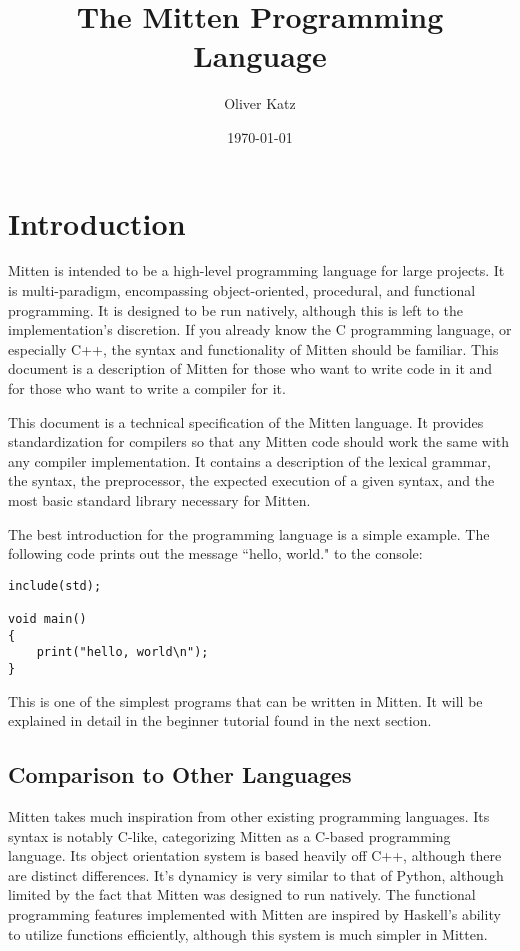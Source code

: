 \documentclass[10pt,a4paper]{article}
\title{The Mitten Programming Language}
\author{Oliver Katz}
\date{\today}
\begin{document}
\maketitle
\tableofcontents
\newpage

\section{Introduction}
Mitten is intended to be a high-level programming language for large projects. It is multi-paradigm, encompassing object-oriented, procedural, and functional programming. It is designed to be run natively, although this is left to the implementation's discretion. If you already know the C programming language, or especially C++, the syntax and functionality of Mitten should be familiar. This document is a description of Mitten for those who want to write code in it and for those who want to write a compiler for it.

This document is a technical specification of the Mitten language. It provides standardization for compilers so that any Mitten code should work the same with any compiler implementation. It contains a description of the lexical grammar, the syntax, the preprocessor, the expected execution of a given syntax, and the most basic standard library necessary for Mitten.

The best introduction for the programming language is a simple example. The following code prints out the message ``hello, world." to the console:
\begin{verbatim}
include(std);

void main()
{
    print("hello, world\n");
}
\end{verbatim}

This is one of the simplest programs that can be written in Mitten. It will be explained in detail in the beginner tutorial found in the next section.

\subsection{Comparison to Other Languages}
Mitten takes much inspiration from other existing programming languages. Its syntax is notably C-like, categorizing Mitten as a C-based programming language. Its object orientation system is based heavily off C++, although there are distinct differences. It's dynamicy is very similar to that of Python, although limited by the fact that Mitten was designed to run natively. The functional programming features implemented with Mitten are inspired by Haskell's ability to utilize functions efficiently, although this system is much simpler in Mitten.
\end{document}

